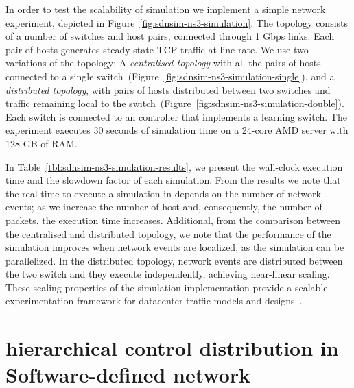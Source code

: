 In order to test the scalability of \sdnsim simulation we implement a
simple network experiment, depicted in Figure~\ref{fig:sdnsim-ns3-simulation}.
The topology consists of a number of switches and host pairs,
connected through 1 Gbps links.  Each pair of hosts generates steady
state TCP traffic at line rate.  We use two variations of the topology: A {\it
  centralised topology} \/with all the pairs of hosts connected to a single
switch~(Figure~\ref{fig:sdnsim-ns3-simulation-single}), and a {\it distributed
  topology}, with pairs of hosts distributed between two switches and traffic
remaining local to the switch~(Figure~\ref{fig:sdnsim-ns3-simulation-double}).
Each switch is connected to an \of controller that implements a learning switch.
The experiment executes 30 seconds of simulation time on a 24-core AMD server
with 128 GB of RAM. 

In Table~\ref{tbl:sdnsim-ns3-simulation-results}, we present the wall-clock
execution time and the slowdown factor of each simulation.  From the results we
note that the real time to execute a simulation in \sdnsim depends on the number
of network events; as we increase the number of host and, consequently, the
number of packets, the execution time increases.  Additional, from the
comparison between the centralised and distributed topology, we note that the
performance of the simulation improves when network events are localized, as the
simulation can be parallelized. In the distributed topology, network events are
distributed between the two switch and they execute independently, achieving
near-linear scaling. These scaling properties of the \sdnsim simulation
implementation provide a scalable experimentation framework for datacenter
traffic models and designs~\cite{Kandula09}. 


\section{hierarchical control distribution in Software-defined network} 
\label{sec:rdsf-eval}

